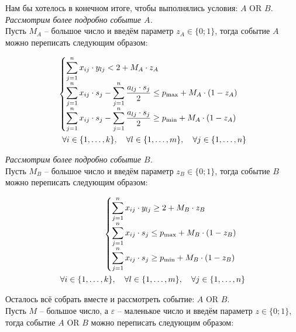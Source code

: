 \documentclass[14pt,fleqn]{extarticle}
\begin{document}
	Нам бы хотелось в конечном итоге, чтобы выполнялись условия: $A$ OR $B$.\\
	
	\textit{Рассмотрим более подробно событие $A$.}\\
	Пусть $M_A$ -- большое число и введём параметр $z_A \in \{0;1\}$, тогда событие $A$ можно переписать следующим образом:
	\begin{ceqn}
		\begin{align*}
			\begin{cases}
				\smashoperator[r]{\sum_{j=1}^{n}} x_{ij} \cdot y_{lj} < 2 + M_A \cdot z_A\\
				\smashoperator[r]{\sum_{j=1}^{n}} x_{ij} \cdot s_j - \smashoperator[r]{\sum_{j=1}^{n}} \dfrac{a_{lj} \cdot s_j}{2} \leq p_{\max} +  M_A \cdot (1 - z_A)\\
				\smashoperator[r]{\sum_{j=1}^{n}} x_{ij} \cdot s_j - \smashoperator[r]{\sum_{j=1}^{n}} \dfrac{a_{lj} \cdot s_j}{2} \geq p_{\min} +  M_A \cdot (1 - z_A)\\
			\end{cases}\\
			\forall i \in \{1, \dots, k\}, \quad \forall l \in \{1, \dots, m\}, \quad \forall j \in \{1, \dots, n\}
		\end{align*}
	\end{ceqn}
	
	\textit{Рассмотрим более подробно событие $B$.}\\
	Пусть $M_B$ -- большое число и введём параметр $z_B \in \{0;1\}$, тогда событие $B$ можно переписать следующим образом:
	\begin{ceqn}
		\begin{align*}
			\begin{cases}
				\smashoperator[r]{\sum_{j=1}^{n}} x_{ij} \cdot y_{lj} \geq 2 + M_B \cdot z_B\\
				\smashoperator[r]{\sum_{j=1}^{n}} x_{ij} \cdot s_j \leq p_{\max} +  M_B \cdot (1 - z_B)\\
				\smashoperator[r]{\sum_{j=1}^{n}} x_{ij} \cdot s_j \geq p_{\min} + M_B \cdot (1 - z_B)\\
			\end{cases}\\
			\forall i \in \{1, \dots, k\}, \quad \forall l \in \{1, \dots, m\}, \quad \forall j \in \{1, \dots, n\}
		\end{align*}
	\end{ceqn}

	\newpage
	
	Осталось всё собрать вместе и рассмотреть событие: $A$ OR $B$.\\
	Пусть $M$ -- большое число, а $\varepsilon$ -- маленькое число и введём параметр $z \in \{0;1\}$, тогда событие $A$ OR $B$ можно переписать следующим образом:
	
\end{document}
